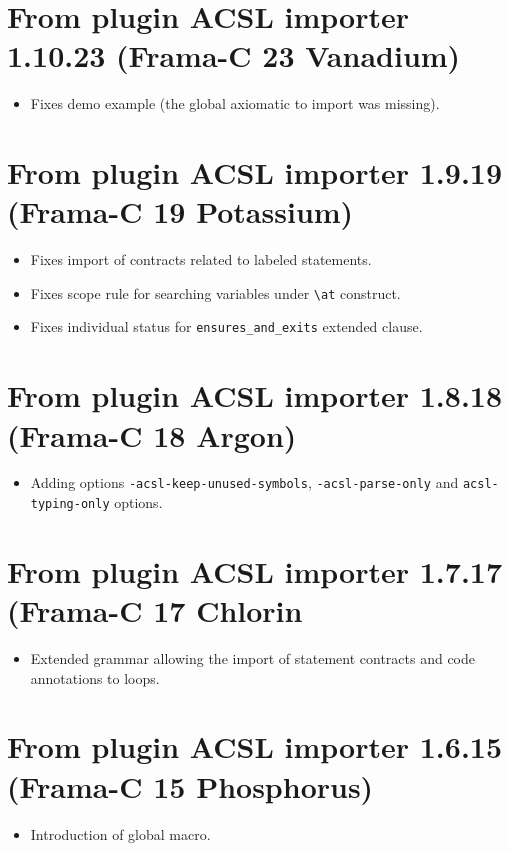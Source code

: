 \section*{From plugin ACSL importer 1.10.23 (Frama-C 23 Vanadium)}
\begin{itemize}
\item Fixes demo example (the global axiomatic to import was missing).
\end{itemize}

\section*{From plugin ACSL importer 1.9.19 (Frama-C 19 Potassium)}
\begin{itemize}
\item Fixes import of contracts related to labeled statements.
\item Fixes scope rule for searching variables under \verb|\at| construct.
\item Fixes individual status for \verb|ensures_and_exits| extended clause.
\end{itemize}

\section*{From plugin ACSL importer 1.8.18 (Frama-C 18 Argon)}
\begin{itemize}
\item Adding options \verb|-acsl-keep-unused-symbols|, \verb|-acsl-parse-only| and \verb|acsl-typing-only| options.
\end{itemize}

\section*{From plugin ACSL importer 1.7.17 (Frama-C 17 Chlorin}
\begin{itemize}
\item Extended grammar allowing the import of statement contracts and code annotations to loops.
\end{itemize}

\section*{From plugin ACSL importer 1.6.15 (Frama-C 15 Phosphorus)}
\begin{itemize}
\item Introduction of global macro.
\end{itemize}

